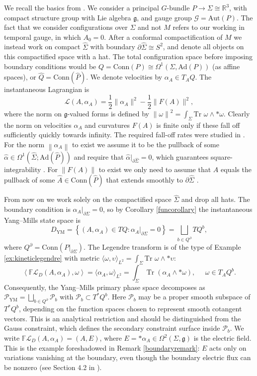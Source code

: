 \documentclass{article}
\newcommand{\R}{\mathbb{R}}
\newcommand{\norm}[1]{\left\lVert#1\right\rVert}
\theoremstyle{definition}
\begin{document}
We recall the basics from \cite{Borsboom:2025agn}. We consider a principal $G$-bundle $P\to\Sigma\cong \R^3$, with compact structure group with Lie algebra $\mathfrak{g}$, and gauge group $\mathcal{G}=\text{Aut}(P)$. The fact that we consider configurations over $\Sigma$ and not $M$ refers to our working in temporal gauge, in which $A_0=0$. After a conformal compactification of $M$ we instead work on compact $\hat{\Sigma}$ with boundary $\partial\hat{\Sigma}\cong S^2$, and denote all objects on this compactified space with a hat. The total configuration space before imposing boundary conditions would be $Q=\text{Conn}(P)\cong \Omega^1(\Sigma,\text{Ad}(P))$ (as affine spaces), or $\hat{Q}=\text{Conn}(\hat{P})$. We denote velocities by $\alpha_A\in T_AQ$. The instantaneous Lagrangian is
\[
\mathcal L(A,\alpha_A)
=
\frac12\|\alpha_A\|^2
-
\frac12\|F(A)\|^2,
\]
where the norm on $\mathfrak{g}$-valued forms is defined by $\norm{\omega}^2=\int_\Sigma \text{Tr }\omega\wedge *\omega$. Clearly the norm on velocities $\alpha_A$ and curvatures $F(A)$ is finite only if these fall off sufficiently quickly towards infinity. The required fall-off rates were studied in \cite{Borsboom:2025agn}. For the norm $\norm{\alpha_A}$ to exist we assume it to be the pullback of some $\hat{\alpha}\in \Omega^1(\hat{\Sigma};\text{Ad}(\hat{P}))$ and require that $\hat{\alpha}|_{\partial\hat{\Sigma}}=0$, which guarantees square-integrability \cite[Proposition 3.2]{Borsboom:2025agn}. For $\norm{F(A)}$ to exist we only need to assume that $A$ equals the pullback of some $\hat{A}\in\text{Conn}(\hat{P})$ that extends smoothly to $\partial\hat{\Sigma}$ \cite[Proposition 3.3]{Borsboom:2025agn}.

From now on we work solely on the compactified space $\hat{\Sigma}$ and drop all hats. The boundary condition is $\alpha_A|_{\partial\Sigma}=0$, so by Corollary \ref{funcorollary} the instantaneous Yang--Mills state
space is
\[
D_{\mathrm{YM}}
=
\left\{
(A,\alpha_A)\in TQ:
\alpha_A|_{\partial\Sigma}=0
\right\}
=
\bigsqcup_{b\in Q^\partial}TQ^b,
\]
where $Q^\partial=\text{Conn}(P|_{\partial\Sigma})$. The Legendre transform is of the type of Example \ref{ex:kineticlegendre} with metric $\langle\omega,\upsilon\rangle_{L^2}=\int_\Sigma\text{Tr } \omega\wedge*\upsilon$:
\[
\left\langle
\mathbb F\mathcal L_D(A,\alpha_A),\omega
\right\rangle
=\langle \alpha_A,\omega\rangle_{L^2}=
\int_\Sigma\operatorname{Tr}(\alpha_A\wedge *\omega),\;\;\;\;\;\omega\in T_AQ^b.
\]
Consequently, the Yang--Mills primary phase space decomposes as $\mathcal{P}_{\mathrm{YM}}
=
\bigsqcup_{b\in Q^\partial}\mathcal{P}_b$ with $
\mathcal{P}_b\subset T^*Q^b$. Here \(\mathcal{P}_b\) may be a proper smooth subspace of \(T^*Q^b\), depending on the function spaces chosen to represent smooth cotangent vectors. This is an analytical restriction and should be distinguished from the Gauss constraint, which defines the secondary constraint surface
inside \(\mathcal{P}_b\). We write $\mathbb F\mathcal L_D(A,\alpha_A)=(A,E)$, where $E=*\alpha_A\in \Omega^2(\Sigma,\mathfrak{g})$ is the electric field. This is the example foreshadowed in Remark \ref{boundaryremark}: $E$ acts only on variations vanishing at the boundary, even though the boundary electric flux can be nonzero (see Section 4.2 in \cite{Borsboom:2025agn}).
\end{document}
